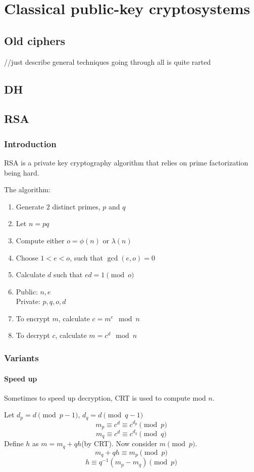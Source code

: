 \documentclass{report}
\newcommand{\tmod}{\text{mod }}
\begin{document}
\part{Classical public-key cryptosystems}
\chapter{Old ciphers}
//just describe general techniques going through all is quite rarted
\chapter{DH}
\chapter{RSA}
\section{Introduction}
RSA is a private key cryptography algorithm that relies on prime factorization being hard.

The algorithm:

\begin{enumerate}
	\item Generate $2$ distinct primes, $p$ and $q$
	\item Let $n=pq$
	\item Compute either $o=\phi(n)$ or $\lambda(n)$
	\item Choose $1<e<o$, such that $\gcd(e,o)=0$
	\item Calculate $d$ such that $ed=1\pmod o$
	\item Public: $n,e$\\Private: $p,q,o,d$
	\item To encrypt $m$, calculate $c=m^e\mod n$
	\item To decrypt $c$, calculate $m=c^d\mod n$
\end{enumerate}

\section{Variants}
\subsection{Speed up}
Sometimes to speed up decryption, CRT is used to compute $\tmod n$.

Let $d_p=d\pmod{p-1}$, $d_q=d\pmod{q-1}$
$$m_p\equiv c^d\equiv c^{d_p}\pmod p$$
$$m_q\equiv c^d\equiv c^{d_q}\pmod q$$
Define $h$ as $m=m_q+qh$(by CRT). Now consider $m\pmod p$.
$$m_q+qh\equiv m_p\pmod p$$
$$h\equiv q^{-1}\left(m_p-m_q\right)\pmod p$$
\end{document}
